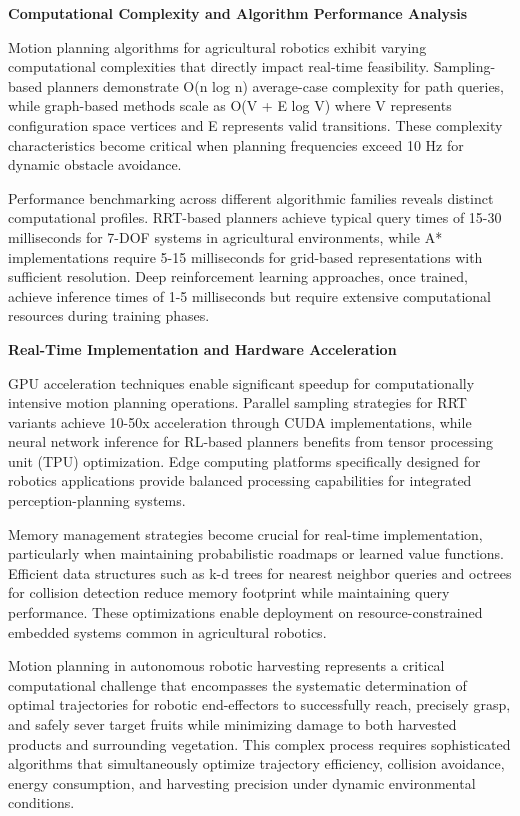 \documentclass{ieeeaccess}
\begin{document}
\textbf{Computational Complexity and Algorithm Performance Analysis}

Motion planning algorithms for agricultural robotics exhibit varying computational complexities that directly impact real-time feasibility. Sampling-based planners demonstrate O(n log n) average-case complexity for path queries, while graph-based methods scale as O(V + E log V) where V represents configuration space vertices and E represents valid transitions. These complexity characteristics become critical when planning frequencies exceed 10 Hz for dynamic obstacle avoidance.

Performance benchmarking across different algorithmic families reveals distinct computational profiles. RRT-based planners achieve typical query times of 15-30 milliseconds for 7-DOF systems in agricultural environments, while A* implementations require 5-15 milliseconds for grid-based representations with sufficient resolution. Deep reinforcement learning approaches, once trained, achieve inference times of 1-5 milliseconds but require extensive computational resources during training phases.

\textbf{Real-Time Implementation and Hardware Acceleration}

GPU acceleration techniques enable significant speedup for computationally intensive motion planning operations. Parallel sampling strategies for RRT variants achieve 10-50x acceleration through CUDA implementations, while neural network inference for RL-based planners benefits from tensor processing unit (TPU) optimization. Edge computing platforms specifically designed for robotics applications provide balanced processing capabilities for integrated perception-planning systems.

Memory management strategies become crucial for real-time implementation, particularly when maintaining probabilistic roadmaps or learned value functions. Efficient data structures such as k-d trees for nearest neighbor queries and octrees for collision detection reduce memory footprint while maintaining query performance. These optimizations enable deployment on resource-constrained embedded systems common in agricultural robotics.

Motion planning in autonomous robotic harvesting represents a critical computational challenge that encompasses the systematic determination of optimal trajectories for robotic end-effectors to successfully reach, precisely grasp, and safely sever target fruits while minimizing damage to both harvested products and surrounding vegetation. This complex process requires sophisticated algorithms that simultaneously optimize trajectory efficiency, collision avoidance, energy consumption, and harvesting precision under dynamic environmental conditions.
\end{document}
